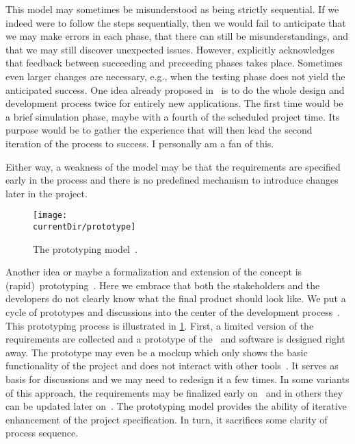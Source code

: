 This model may sometimes be misunderstood as being strictly sequential.
If we indeed were to follow the steps sequentially, then we would fail to anticipate that we may make errors in each phase, that there can still be misunderstandings, and that we may still discover unexpected issues.
However, \citeauthor{R1970MTDOLSS} explicitly acknowledges that feedback between succeeding and preceeding phases takes place.
Sometimes even larger changes are necessary, e.g., when the testing phase does not yield the anticipated success.
One idea already proposed in~\cite{R1970MTDOLSS} is to do the whole design and development process twice for entirely new applications.
The first time would be a brief simulation phase, maybe with a fourth of the scheduled project time.
Its purpose would be to gather the experience that will then lead the second iteration of the process to success.
I personally am a fan of this.

Either way, a weakness of the model may be that the requirements are specified early in the process and there is no predefined mechanism to introduce changes later in the project.

\begin{figure}%
\centering%
\texttt{[image: \\currentDir/prototype]}%
\caption{The prototyping model~\cite{PA2009SETAP,GMTM2011DDLC,L1989SETRP}.}%
\label{fig:model:prototype}%
\end{figure}%
%
Another idea or maybe a formalization and extension of the  concept is (rapid)~prototyping~\cite{L1989SETRP}.
Here we embrace that both the stakeholders and the developers do not clearly know what the final product should look like.
We put a cycle of prototypes and discussions into the center of the development process~\cite{BLM2023AEBMOSPAMSAAMCS,L1989SETRP}.
This prototyping process is illustrated in \cref{fig:model:prototype}.
First, a limited version of the requirements are collected and a prototype of the \db\ and software is designed right away.
The prototype may even be a mockup which only shows the basic functionality of the project and does not interact with other tools~\cite{BLM2023AEBMOSPAMSAAMCS}.
It serves as basis for discussions and we may need to redesign it a few times.
In some variants of this approach, the requirements may be finalized early on~\cite{PA2009SETAP,GMTM2011DDLC} and in others they can be updated later on~\cite{L1989SETRP}.
The prototyping model provides the ability of iterative enhancement of the project specification.
In turn, it sacrifices some clarity of process sequence.

